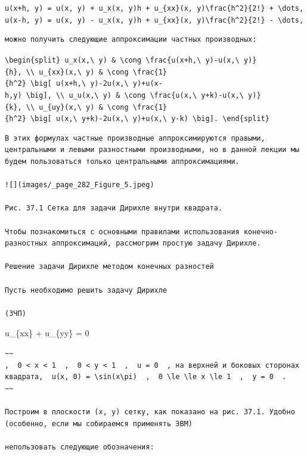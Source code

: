\documentclass[
  ukrainian,
]{article}
\begin{document}
\texttt{u(x+h,\ y)\ =\ u(x,\ y)\ +\ u\_x(x,\ y)h\ +\ u\_\{xx\}(x,\ y)\textbackslash{}frac\{h\^{}2\}\{2!\}\ +\ \textbackslash{}dots,}
\texttt{u(x-h,\ y)\ =\ u(x,\ y)\ -\ u\_x(x,\ y)h\ +\ u\_\{xx\}(x,\ y)\textbackslash{}frac\{h\^{}2\}\{2!\}\ -\ \textbackslash{}dots,}

\begin{verbatim}
можно получить следующие аппроксимации частных производных:
\end{verbatim}

\texttt{\textbackslash{}begin\{split\}\ u\_x(x,\textbackslash{}\ y)\ \&\ \textbackslash{}cong\ \textbackslash{}frac\{u(x+h,\textbackslash{}\ y)-u(x,\textbackslash{}\ y)\}\{h\},\ \textbackslash{}\textbackslash{}\ u\_\{xx\}(x,\textbackslash{}\ y)\ \&\ \textbackslash{}cong\ \textbackslash{}frac\{1\}\{h\^{}2\}\ \textbackslash{}big{[}\ u(x+h,\textbackslash{}\ y)-2u(x,\textbackslash{}\ y)+u(x-h,y)\ \textbackslash{}big{]},\ \textbackslash{}\textbackslash{}\ u\_u(x,\textbackslash{}\ y)\ \&\ \textbackslash{}cong\ \textbackslash{}frac\{u(x,\textbackslash{}\ y+k)-u(x,\textbackslash{}\ y)\}\{k\},\ \textbackslash{}\textbackslash{}\ u\_\{uy\}(x,\textbackslash{}\ y)\ \&\ \textbackslash{}cong\ \textbackslash{}frac\{1\}\{h\^{}2\}\ \textbackslash{}big{[}\ u(x,\textbackslash{}\ y+k)-2u(x,\textbackslash{}\ y)+u(x,\textbackslash{}\ y-k)\ \textbackslash{}big{]}.\ \textbackslash{}end\{split\}}

\begin{verbatim}
В этих формулах частные производные аппроксимируются правыми, центральными и левыми разностными производными, но в данной лекции мы будем пользоваться только центральными аппроксимациями.

![](images/_page_282_Figure_5.jpeg)

Рис. 37.1 Сетка для задачи Дирихле внутри квадрата.

Чтобы познакомиться с основными правилами использования конечно-разностных аппроксимаций, рассмогрим простую задачу Дирихле.

Решение задачи Дирихле методом конечных разностей

Пусть необходимо решить задачу Дирихле

(ЗЧП)
\end{verbatim}

u\_\{xx\} + u\_\{yy\} = 0

\begin{verbatim}
~~
,  0 < x < 1  ,  0 < y < 1  ,  u = 0  , на верхней и боковых сторонах квадрата,  u(x, 0) = \sin(x\pi)  ,  0 \le \le x \le 1  ,  y = 0  .
~~

Построим в плоскости (x, y) сетку, как показано на рис. 37.1. Удобно (особенно, если мы собираемся применять ЭВМ)

непользовать следующие обозначения:
\end{verbatim}
\end{document}
